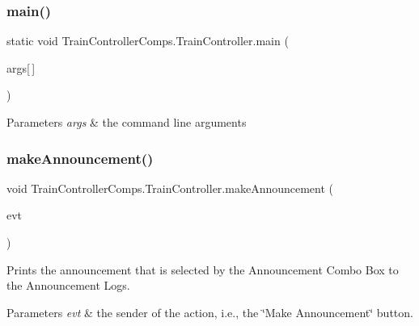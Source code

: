 \subsubsection{\texorpdfstring{main()}{main()}}
{\footnotesize\ttfamily static void Train\+Controller\+Comps.\+Train\+Controller.\+main (\begin{DoxyParamCaption}\item[{String}]{args\mbox{[}$\,$\mbox{]} }\end{DoxyParamCaption})\hspace{0.3cm}{\ttfamily [static]}}


\begin{DoxyParams}{Parameters}
{\em args} & the command line arguments \\
\hline
\end{DoxyParams}
\mbox{\label{classTrainControllerComps_1_1TrainController_a754224a8b34116cffd0c39ed93a92f5e}} 
\subsubsection{\texorpdfstring{make\+Announcement()}{makeAnnouncement()}}
{\footnotesize\ttfamily void Train\+Controller\+Comps.\+Train\+Controller.\+make\+Announcement (\begin{DoxyParamCaption}\item[{java.\+awt.\+event.\+Action\+Event}]{evt }\end{DoxyParamCaption})\hspace{0.3cm}{\ttfamily [private]}}



Prints the announcement that is selected by the Announcement Combo Box to the Announcement Logs. 


\begin{DoxyParams}{Parameters}
{\em evt} & the sender of the action, i.\+e., the \char`\"{}\+Make Announcement\char`\"{} button. \\
\hline
\end{DoxyParams}
\mbox{\label{classTrainControllerComps_1_1TrainController_add9a237c1fd6d40484f79d43f22517a0}} 
